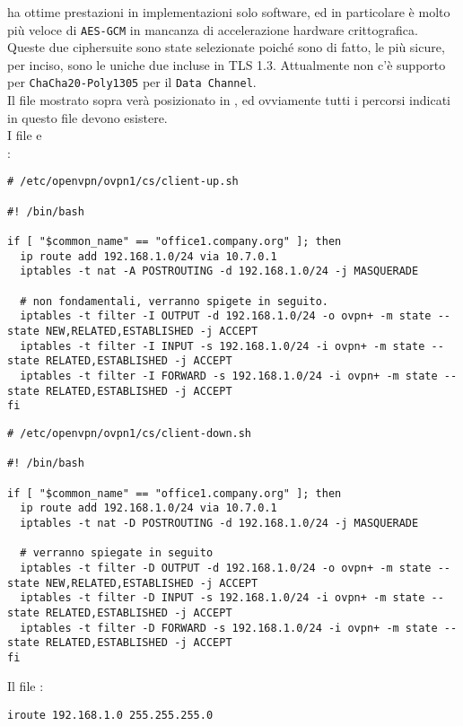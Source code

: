 ha ottime prestazioni in implementazioni solo software, ed in particolare è molto
più veloce di \texttt{AES-GCM} in mancanza di accelerazione hardware crittografica.
Queste due ciphersuite sono state selezionate poiché sono di fatto, le più sicure,
per inciso, sono le uniche due incluse in TLS 1.3. Attualmente non c'è supporto
per \texttt{ChaCha20-Poly1305} per il \texttt{Data Channel}.\\
Il file mostrato sopra verà posizionato in , ed
ovviamente tutti i percorsi indicati in questo file devono esistere.\\
I file  e \\
:
\begin{verbatim}
# /etc/openvpn/ovpn1/cs/client-up.sh

#! /bin/bash

if [ "$common_name" == "office1.company.org" ]; then
  ip route add 192.168.1.0/24 via 10.7.0.1
  iptables -t nat -A POSTROUTING -d 192.168.1.0/24 -j MASQUERADE

  # non fondamentali, verranno spigete in seguito.
  iptables -t filter -I OUTPUT -d 192.168.1.0/24 -o ovpn+ -m state --state NEW,RELATED,ESTABLISHED -j ACCEPT
  iptables -t filter -I INPUT -s 192.168.1.0/24 -i ovpn+ -m state --state RELATED,ESTABLISHED -j ACCEPT
  iptables -t filter -I FORWARD -s 192.168.1.0/24 -i ovpn+ -m state --state RELATED,ESTABLISHED -j ACCEPT
fi
\end{verbatim}

\begin{verbatim}
# /etc/openvpn/ovpn1/cs/client-down.sh

#! /bin/bash

if [ "$common_name" == "office1.company.org" ]; then
  ip route add 192.168.1.0/24 via 10.7.0.1
  iptables -t nat -D POSTROUTING -d 192.168.1.0/24 -j MASQUERADE

  # verranno spiegate in seguito
  iptables -t filter -D OUTPUT -d 192.168.1.0/24 -o ovpn+ -m state --state NEW,RELATED,ESTABLISHED -j ACCEPT
  iptables -t filter -D INPUT -s 192.168.1.0/24 -i ovpn+ -m state --state RELATED,ESTABLISHED -j ACCEPT
  iptables -t filter -D FORWARD -s 192.168.1.0/24 -i ovpn+ -m state --state RELATED,ESTABLISHED -j ACCEPT
fi
\end{verbatim}
Il file :
\begin{verbatim}
iroute 192.168.1.0 255.255.255.0
\end{verbatim}

